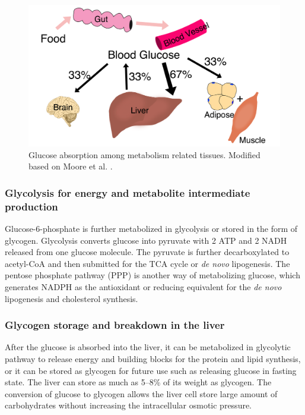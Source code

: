 \begin{figure}[htbp]
\centering
\includegraphics[width=1\textwidth]{figs/fig1-2 liver glucose.png}
\caption[Glucose redistribution in whole body]{\footnotesize Glucose absorption among metabolism related tissues. Modified based on Moore et al. \cite{moore_regulation_2012}.}
\label{fig:fig1.2}
\end{figure}


\subsubsection{Glycolysis for energy and metabolite intermediate production}

Glucose-6-phosphate is further metabolized in glycolysis or stored in the form of glycogen. Glycolysis converts glucose into pyruvate with 2 ATP and 2 NADH released from one glucose molecule. The pyruvate is further decarboxylated to acetyl-CoA and then submitted for the TCA cycle or \textit{de novo} lipogenesis. The pentose phosphate pathway (PPP) is another way of metabolizing glucose, which generates NADPH as the antioxidant or reducing equivalent for the \textit{de novo} lipogenesis and cholesterol synthesis.

\subsubsection{Glycogen storage and breakdown in the liver}

After the glucose is absorbed into the liver, it can be metabolized in glycolytic pathway to release energy and building blocks for the protein and lipid synthesis, or it can be stored as glycogen for future use such as releasing glucose in fasting state. The liver can store as much as 5--8\% of its weight as glycogen. The conversion of glucose to glycogen allows the liver cell store large amount of carbohydrates without increasing the intracellular osmotic pressure.

